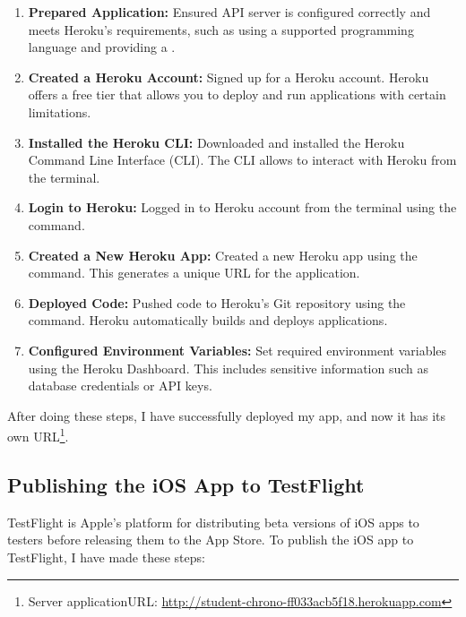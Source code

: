 \documentclass[
  biblatex = false,
  language=english,
  figures=false,
  sourcecodes,
  glossaries,
  index
]{kidiplom}
\begin{document}
\begin{enumerate}
    \item \textbf{Prepared Application:} Ensured API server is configured correctly and meets Heroku's requirements, such as using a supported programming language and providing a .
    \item \textbf{Created a Heroku Account:} Signed up for a Heroku account. Heroku offers a free tier that allows you to deploy and run applications with certain limitations.
    \item \textbf{Installed the Heroku CLI:} Downloaded and installed the Heroku Command Line Interface (CLI). The CLI allows to interact with Heroku from the terminal.
    \item \textbf{Login to Heroku:} Logged in to Heroku account from the terminal using the  command.
    \item \textbf{Created a New Heroku App:} Created a new Heroku app using the  command. This generates a unique URL for the application.
    \item \textbf{Deployed Code:} Pushed code to Heroku's Git repository using the  command. Heroku automatically builds and deploys applications.
    
    \item \textbf{Configured Environment Variables:} Set required environment variables using the Heroku Dashboard. This includes sensitive information such as database credentials or API keys.
\end{enumerate}
After doing these steps, I have successfully deployed my app, and now it has its own URL\footnote{Server applicationURL: \url{http://student-chrono-ff033acb5f18.herokuapp.com}}.

\subsection{Publishing the iOS App to TestFlight}

TestFlight is Apple's platform for distributing beta versions of iOS apps to testers before releasing them to the App Store. To publish the iOS app to TestFlight, I have made these steps:
\end{document}
